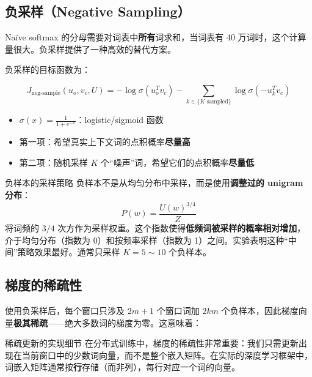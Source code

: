 \documentclass[a4paper]{article}
\begin{document}
\subsection{负采样（Negative Sampling）}

Na\"ive softmax 的分母需要对词表中\textbf{所有}词求和，当词表有 40 万词时，这个计算量很大。负采样提供了一种高效的替代方案。





负采样的目标函数为：

$$J_{\text{neg-sample}}(u_o, v_c, U) = -\log \sigma(u_o^T v_c) - \sum_{k \in \{K \text{ sampled}\}} \log \sigma(-u_k^T v_c)$$

\begin{itemize}
    \item $\sigma(x) = \frac{1}{1 + e^{-x}}$：logistic/sigmoid 函数
    \item 第一项：希望真实上下文词的点积概率\textbf{尽量高}
    \item 第二项：随机采样 $K$ 个``噪声''词，希望它们的点积概率\textbf{尽量低}
\end{itemize}





\begin{knowledgebox}{负样本的采样策略}
负样本不是从均匀分布中采样，而是使用\textbf{调整过的 unigram 分布}：
$$P(w) = \frac{U(w)^{3/4}}{Z}$$
将词频的 $3/4$ 次方作为采样权重。这个指数使得\textbf{低频词被采样的概率相对增加}，介于均匀分布（指数为 0）和按频率采样（指数为 1）之间。实验表明这种``中间''策略效果最好。通常只采样 $K = 5 \sim 10$ 个负样本。
\end{knowledgebox}

\subsection{梯度的稀疏性}





使用负采样后，每个窗口只涉及 $2m + 1$ 个窗口词加 $2km$ 个负样本，因此梯度向量\textbf{极其稀疏}——绝大多数词的梯度为零。这意味着：





\begin{warningbox}{稀疏更新的实现细节}
在分布式训练中，梯度的稀疏性非常重要：我们只需更新出现在当前窗口中的少数词向量，而不是整个嵌入矩阵。在实际的深度学习框架中，词嵌入矩阵通常按\textbf{行}存储（而非列），每行对应一个词的向量。
\end{warningbox}
\end{document}
